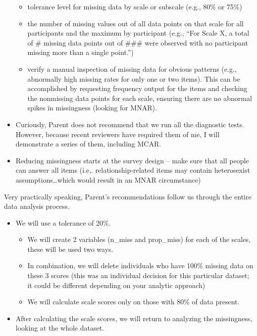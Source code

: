 \documentclass[
  english,
]{book}
\providecommand{\tightlist}{%
  \setlength{\itemsep}{0pt}\setlength{\parskip}{0pt}}
\begin{document}
\begin{itemize}
  \begin{itemize}
  \tightlist
  \item
    tolerance level for missing data by scale or subscale (e.g., 80\% or 75\%)
  \item
    the number of missing values out of all data points on that scale for all participants and the maximum by participant (e.g., ``For Scale X, a total of \# missing data points out of \#\#\# were observed with no participant missing more than a single point.'')
  \item
    verify a manual inspection of missing data for obvious patterns (e.g., abnormally high missing rates for only one or two items). This can be accomplished by requesting frequency output for the items and checking the nonmissing data points for each scale, ensuring there are no abnormal spikes in missingness (looking for MNAR).
  \end{itemize}
\item
  Curiously, Parent \citeyearpar{parent_handling_2013} does not recommend that we run all the diagnostic tests. However, because recent reviewers have required them of me, I will demonstrate a series of them, including MCAR.
\item
  Reducing missingness starts at the survey design -- make sure that all people can answer all items (i.e,. relationship-related items may contain heterosexist assumptions\ldots which would result in an MNAR circumstance)
\end{itemize}

Very practically speaking, Parent's \citeyearpar{parent_handling_2013} recommendations follow us through the entire data analysis process.

\begin{itemize}
\tightlist
\item
  We will use a tolerance of 20\%.

  \begin{itemize}
  \tightlist
  \item
    We will create 2 variables (n\_miss and prop\_miss) for each of the scales, these will be used two ways.
  \item
    In combination, we will delete individuals who have 100\% missing data on these 3 scores (this was an individual decision for this particular dataset; it could be different depending on your analytic approach)
  \item
    We will calculate scale scores only on those with 80\% of data present.
  \end{itemize}
\item
  After calculating the scale scores, we will return to analyzing the missingness, looking at the whole dataset.
\end{itemize}
\end{document}
